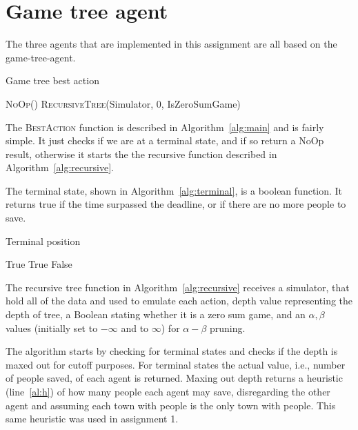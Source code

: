 \documentclass{article}                     %
\begin{document}
	\section{Game tree agent}
	The three agents that are implemented in this assignment are all based on the game-tree-agent.
	\begin{algorithm}[H]
		\caption{Game tree best action}
		\label{alg:main}
		\begin{algorithmic}[1]
			\State  \Return \textsc{NoOp()}
			\EndIf
			\State \Return \textsc{RecursiveTree}(Simulator, 0, IsZeroSumGame)
			\EndProcedure
		\end{algorithmic}
	\end{algorithm}
	The  \textsc{BestAction} function is described in Algorithm~\ref{alg:main} and is fairly simple. It just checks if we are at a terminal state, and if so return a NoOp result, otherwise it starts the the recursive function described in Algorithm~\ref{alg:recursive}.
	
	The terminal state, shown in Algorithm~\ref{alg:terminal}, is a boolean function. It returns true if the time surpassed the deadline, or if there are no more people to save. 
	
	
	
	\begin{algorithm}
		\caption{Terminal position}
		\label{alg:terminal}		
		\begin{algorithmic}[1]
			\State  \Return True
			\State  \Return True
			\Else
			\State \Return False
			\EndIf
			\EndProcedure
		\end{algorithmic}
	\end{algorithm}
	
	The recursive tree function in Algorithm~\ref{alg:recursive} receives a simulator, that hold all of the data and used to emulate each action, depth value representing the depth of tree, a Boolean stating whether it is a zero sum game, and an $\alpha, \beta$ values (initially set to $-\infty$ and to $\infty$) for $\alpha - \beta$ pruning. 
	
	The algorithm starts by checking for terminal states and checks if the depth is maxed out for cutoff purposes. For terminal states the actual value, i.e., number of people saved, of each agent is returned. Maxing out depth returns a heuristic (line~\ref{al:h}) of how many people each agent may save, disregarding the other agent and assuming each town with people is the only town with people.
	This same heuristic was used in assignment 1.
	
\end{document}
